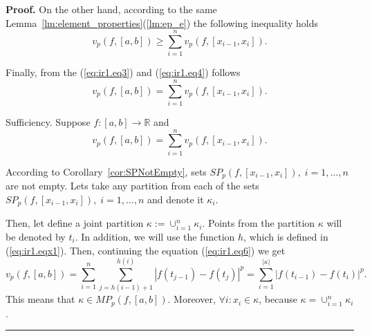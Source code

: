 \documentclass[12pt, a4paper]{article}
\newenvironment{proof}[1][Proof]{\noindent \textbf{#1.} }{\  \rule{0.5em}{0.5em}}
\numberwithin{equation}{section}
\begin{document}
\begin{proof}
  On the other hand, according to the same
  Lemma~\ref{lm:element_properties}(\ref{lm:ep_e}) 
  the following inequality holds
  \begin{equation}\label{eq:ir1.eq4}
    v_p(f,[a,b]) \geq \sum_{i=1}^n v_p(f,[x_{i-1},x_i]).
  \end{equation}
  
  Finally, from the (\ref{eq:ir1.eq3}) and (\ref{eq:ir1.eq4}) follows 
  \begin{equation}\label{eq:ir1.eq5}
    v_p(f,[a,b]) = \sum_{i=1}^n v_p(f,[x_{i-1},x_i]).
  \end{equation}
  
  Sufficiency. Suppose $f:[a,b] \rightarrow \mathbb{R}$ and 
  \begin{equation}\label{eq:ir1.eq6}
    v_p(f,[a,b]) = \sum_{i=1}^n v_p(f,[x_{i-1},x_i]).
  \end{equation}
  
  According to Corollary~\ref{cor:SPNotEmpty}, 
  sets $SP_{p}(f,[x_{i-1},x_i]),\;i=1,\dots,n$ are not empty.  
  Lets take any partition from each of the 
  sets $SP_{p}(f,[x_{i-1},x_i]),\;i=1,\dots,n$ and denote it $\kappa_i$.
    
  
  Then, let define a joint partition $\kappa:=\cup_{i=1}^n \kappa_i$. 
  Points from the partition $\kappa$ will be denoted by $t_i$. 
  In addition, we will use the function $h$, 
  which is defined in (\ref{eq:ir1.eqx1}).
  Then, continuing the equation (\ref{eq:ir1.eq6}) we get
  \begin{equation}\label{eq:ir1.eq7}
  v_p(f,[a,b]) = 
    \sum_{i=1}^n\sum_{j=h(i-1)+1}^{h(i)}|f(t_{j-1})-f(t_j)|^p
    =\sum_{i=1}^{|\kappa|}|f(t_{i-1})-f(t_i)|^p.
  \end{equation}
  This means that $\kappa \in MP_{p}(f,[a,b])$. 
  Moreover, $\forall i:x_i \in \kappa$,
  because $\kappa=\cup_{i=1}^n \kappa_i$.  
\end{proof}
\end{document}
